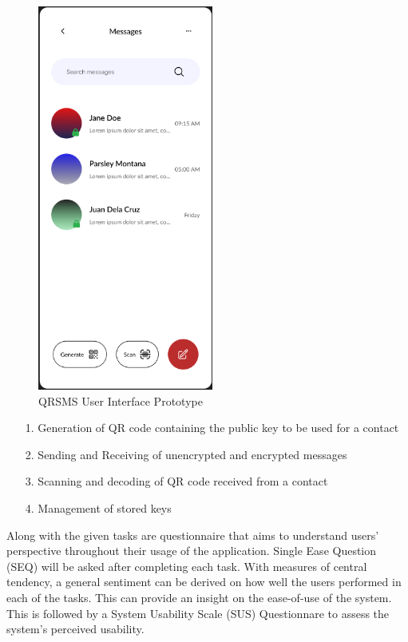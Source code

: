 \documentclass[journal]{./IEEE/IEEEtran}
\begin{document}
\begin{figure}
	\centering
	\includegraphics[height=5in]{./images/QRSMS_main_prototype.png}
	\caption{QRSMS User Interface Prototype}
	\label{QRSMSUI}
\end{figure}

\begin{itemize}
	\item[1.] Generation of QR code containing the public key to be used for
		a contact
	\item[2.] Sending and Receiving of unencrypted and encrypted messages
	\item[3.] Scanning and decoding of QR code received from a contact
	\item[4.] Management of stored keys
\end{itemize}

Along with the given tasks are questionnaire that aims to understand users'
perspective throughout their usage of the application. Single Ease Question
(SEQ) will be asked after completing each task. With measures of central
tendency, a general sentiment can be derived on how well the users performed
in each of the tasks. This can provide an insight on the ease-of-use of the
system. This is followed by a System Usability Scale (SUS) Questionnare
to assess the system's perceived usability.
\end{document}

